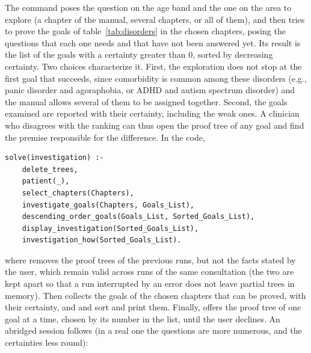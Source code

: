 The command  poses the question on the age band and the one
on the area to explore (a chapter of the manual, several chapters, or all of
them), and then tries to prove the goals of table~\ref{tab:disorders} in the
chosen chapters, posing the questions
that each one needs and that have not been answered yet. Its result is the list
of the goals with a certainty greater than $0$, sorted by decreasing certainty.
Two choices characterize it. First, the exploration does not stop at the first
goal that succeeds, since comorbidity is common among these disorders (e.g.,
panic disorder and agoraphobia, or ADHD and autism spectrum disorder) and the
manual allows several of them to be assigned together. Second, the goals
examined are reported with their certainty, including the weak ones. A
clinician who disagrees with the ranking can thus open the proof tree of any
goal and find the premise responsible for the difference. In the code,
\begin{lstlisting}
solve(investigation) :-
    delete_trees,
    patient(_),
    select_chapters(Chapters),
    investigate_goals(Chapters, Goals_List),
    descending_order_goals(Goals_List, Sorted_Goals_List),
    display_investigation(Sorted_Goals_List),
    investigation_how(Sorted_Goals_List).
\end{lstlisting}
where  removes the proof trees of the previous runs, but
not the facts stated by the user, which remain valid across runs of the same
consultation (the two are kept apart so that a run interrupted by an error does
not leave partial trees in memory). Then 
collects the goals of the chosen chapters that can be proved, with their certainty, and
 and  sort and
print them. Finally,  offers the proof tree of one
goal at a time, chosen by its number in the list, until the user declines. An
abridged session follows (in a real one the questions are more numerous, and
the certainties less round):
